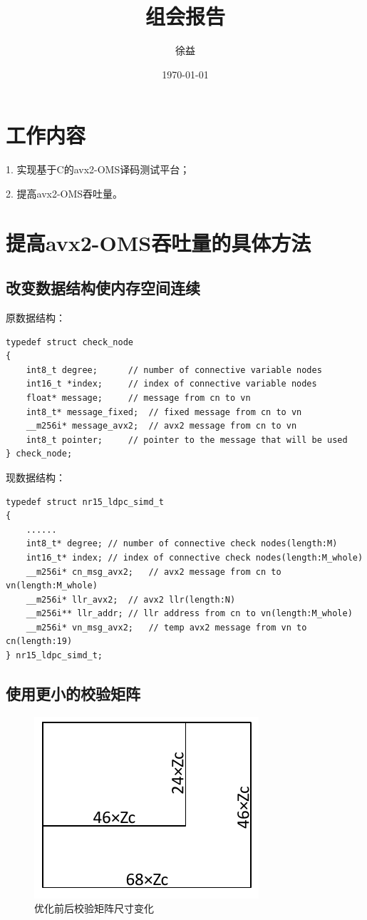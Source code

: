 \documentclass{article}
\title{组会报告}
\author{徐益}
\date{\today}
\begin{document}
\maketitle


\section{工作内容}
1. 实现基于C的avx2-OMS译码测试平台；

2. 提高avx2-OMS吞吐量。

\section{提高avx2-OMS吞吐量的具体方法}
\subsection{改变数据结构使内存空间连续}
原数据结构：
\lstset{language=C++}
\begin{lstlisting}
typedef struct check_node
{
	int8_t degree;		// number of connective variable nodes
	int16_t *index;		// index of connective variable nodes
	float* message;		// message from cn to vn
	int8_t* message_fixed;	// fixed message from cn to vn
	__m256i* message_avx2;	// avx2 message from cn to vn
	int8_t pointer;		// pointer to the message that will be used
} check_node;
\end{lstlisting}
现数据结构：
\lstset{language=C++}
\begin{lstlisting}
typedef struct nr15_ldpc_simd_t
{
	......
	int8_t* degree;	// number of connective check nodes(length:M)
	int16_t* index;	// index of connective check nodes(length:M_whole)
	__m256i* cn_msg_avx2;	// avx2 message from cn to vn(length:M_whole)
	__m256i* llr_avx2;	// avx2 llr(length:N)
	__m256i** llr_addr;	// llr address from cn to vn(length:M_whole)
	__m256i* vn_msg_avx2;	// temp avx2 message from vn to cn(length:19)
} nr15_ldpc_simd_t;
\end{lstlisting}

\subsection{使用更小的校验矩阵}
\begin{figure}[H]
	\centering
	\includegraphics[width = .4\textwidth]{H.pdf}
	\caption{优化前后校验矩阵尺寸变化}
\end{figure}
\end{document}
